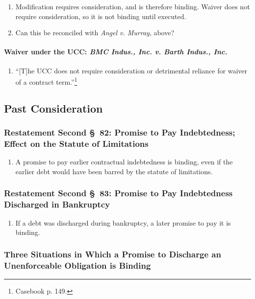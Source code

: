 \begin{enumerate}
    \item Modification requires consideration, and is therefore binding. 
    Waiver does not require consideration, so it is not binding until 
    executed.
    \item Can this be reconciled with \emph{Angel v. Murray}, above?
\end{enumerate}

\paragraph{Waiver under the UCC: \emph{BMC Indus., Inc. v. Barth Indus., 
Inc.}}

\begin{enumerate}
    \item ``[T]he UCC does not require consideration or detrimental reliance 
    for waiver of a contract term.''\footnote{Casebook p. 149.}
\end{enumerate}

\subsection{Past Consideration}

\subsubsection{Restatement Second \S\ 82: Promise to Pay Indebtedness; Effect 
on the Statute of Limitations}

\begin{enumerate}
    \item A promise to pay earlier contractual indebtedness is binding, even 
    if the earlier debt would have been barred by the statute of limitations.
\end{enumerate}

\subsubsection{Restatement Second \S\ 83: Promise to Pay Indebtedness 
Discharged in Bankruptcy}

\begin{enumerate}
    \item If a debt was discharged during bankruptcy, a later promise to pay 
    it is binding.
\end{enumerate}

\subsubsection{Three Situations in Which a Promise to Discharge an Unenforceable 
Obligation is Binding}

